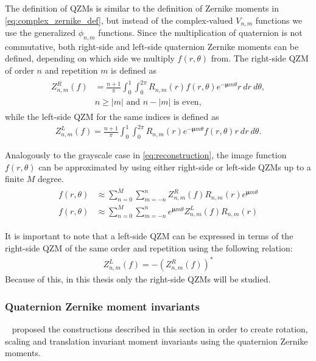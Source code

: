 The definition of QZMs is similar to the definition of Zernike moments in \eqref{eq:complex_zernike_def}, but instead of the complex-valued $V_{n,m}$ functions we use the generalized $\phi_{n,m}$ functions. Since the multiplication of quaternion is not commutative, both right-side and left-side quaternion Zernike moments can be defined, depending on which side we multiply $f(r,\theta)$ from. The right-side QZM of order $n$ and repetition $m$ is defined as
\begin{gather}
    \begin{split}
    Z_{n,m}^R(f) &= \frac{n + 1}{\pi}\int_0^1\int_0^{2\pi}R_{n,m}(r)f(r,\theta)e^{-\bm{\mu}m\theta}r\ dr\ d\theta, \\
    &n \geq |m| \text{  and  } n - |m| \text{  is even,}
    \end{split}
    \label{eq:QZRM}
\end{gather}
while the left-side QZM for the same indices is defined as 
\begin{gather*}
Z_{n,m}^L(f) = \frac{n + 1}{\pi}\int_0^1\int_0^{2\pi}R_{n,m}(r)e^{-\bm{\mu}m\theta}f(r,\theta)r\ dr\ d\theta.
\end{gather*}


Analogously to the grayscale case in \eqref{eq:reconstruction}, the image function $f(r,\theta)$ can be approximated by using either right-side or left-side QZMs up to a finite $M$ degree. 
\begin{gather}
    \begin{split}
      f(r,\theta) &\approx \sum_{n=0}^{M}\sum_{m=-n}^{n}Z_{n,m}^R(f)R_{n,m}(r)e^{\bm{\mu}m\theta} \\
      f(r,\theta) &\approx \sum_{n=0}^{M}\sum_{m=-n}^{n}e^{\bm{\mu}m\theta}Z_{n,m}^L(f)R_{n,m}(r)
    \end{split}\label{eq:qzm_reconstruction}
\end{gather}


It is important to note that a left-side QZM can be expressed in terms of the right-side QZM of the same order and repetition using the following relation:
\begin{gather*}
    Z_{n,m}^L(f) = -(Z_{n,m}^R(f))^{*}
\end{gather*}
Because of this, in this thesis only the right-side QZMs will be studied.

\subsubsection{Quaternion Zernike moment invariants}
\citeauthor{qzmi}~\cite{qzm, qzmi} proposed the constructions described in this section in order to create rotation, scaling and translation invariant moment invariants using the quaternion Zernike moments.

